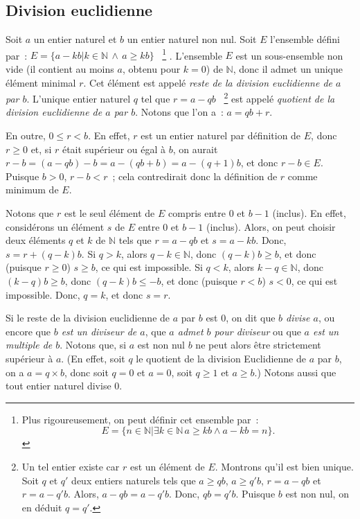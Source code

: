 \subsection{Division euclidienne}

Soit $a$ un entier naturel et $b$ un entier naturel non nul. 
Soit $E$ l'ensemble défini par : $E = \lbrace a - k b \vert k \in \mathbb{N} \, \wedge \, a \geq k b \rbrace$%
~\footnote{Plus rigoureusement, on peut définir cet ensemble par : 
\begin{equation*}
    E = \lbrace
        n \in \mathbb{N} 
        \vert
        \exists k \in \mathbb{N} \,  
        a \geq k b \wedge a - k b = n
    \rbrace .
\end{equation*}}%
. 
L'ensemble $E$ est un sous-ensemble non vide (il contient au moins $a$, obtenu pour $k=0$) de $\mathbb{N}$, donc il admet un unique élément minimal $r$. 
Cet élément est appelé \textit{reste de la division euclidienne de $a$ par $b$}. 
L'unique entier naturel $q$ tel que $r = a - q b$%
~\footnote{Un tel entier existe car $r$ est un élément de $E$. 
    Montrons qu'il est bien unique. 
    Soit $q$ et $q'$ deux entiers naturels tels que $a \geq q b$, $a \geq q' b$, $r = a - q b$ et $r = a - q' b$.
    Alors, $a - q b = a - q' b$.
    Donc, $q b = q' b$.
    Puisque $b$ est non nul, on en déduit $q = q'$.
}  
est appelé \textit{quotient de la division euclidienne de $a$ par $b$}. 
Notons que l'on a : $a = q b + r$. 

En outre, $0 \leq r < b$. 
En effet, $r$ est un entier naturel par définition de $E$, donc $r \geq 0$ et, si $r$ était supérieur ou égal à $b$, on aurait $r - b = (a - q b) - b = a - (q b + b) = a - (q+1) b$, et donc $r - b \in E$. 
Puisque $b > 0$, $r - b < r$ ; cela contredirait donc la définition de $r$ comme minimum de $E$. 

Notons que $r$ est le seul élément de $E$ compris entre $0$ et $b-1$ (inclus). 
En effet, considérons un élément $s$ de $E$ entre $0$ et $b-1$ (inclus). 
Alors, on peut choisir deux éléments $q$ et $k$ de $\mathbb{N}$ tels que $r = a - q b$ et $s = a - k b$. 
Donc, $s = r + (q-k) b$. 
Si $q > k$, alors $q-k \in \mathbb{N}$, donc $(q-k) b \geq b$, et donc (puisque $r \geq 0$) $s \geq b$, ce qui est impossible.
Si $q < k$, alors $k-q \in \mathbb{N}$, donc $(k-q) b \geq b$, donc $(q-k) b \leq -b$, et donc (puisque $r < b$) $s < 0$, ce qui est impossible. 
Donc, $q = k$, et donc $s = r$.

Si le reste de la division euclidienne de $a$ par $b$ est $0$, on dit que \textit{$b$ divise $a$}, ou encore que \textit{$b$ est un diviseur de $a$}, que \textit{$a$ admet $b$ pour diviseur} ou que \textit{$a$ est un multiple de $b$}. 
Notons que, si $a$ est non nul $b$ ne peut alors être strictement supérieur à $a$. 
(En effet, soit $q$ le quotient de la division Euclidienne de $a$ par $b$, on a $a = q \times b$, donc soit $q = 0$ et $a = 0$, soit $q \geq 1$ et $a \geq b$.)
Notons aussi que tout entier naturel divise $0$.


